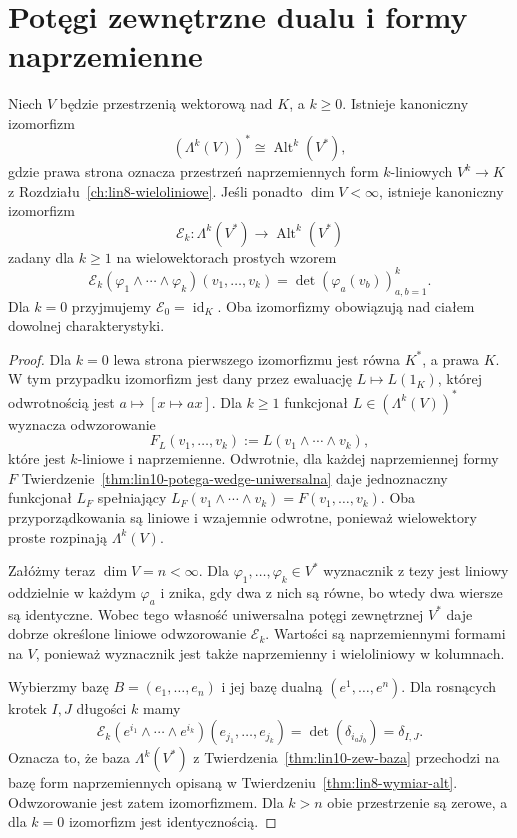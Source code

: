 \section{Potęgi zewnętrzne dualu i formy naprzemienne}
\label{sec:lin10-dual-formy}

\begin{twierdzenie}
\label{thm:lin10-formy-alt}
Niech \(V\) będzie przestrzenią
wektorową nad \(K\), a \(k\ge0\).
Istnieje kanoniczny izomorfizm
\[
 (\Lambda^k(V))^*
 \cong \operatorname{Alt}^k(V^*),
\]
gdzie prawa strona oznacza
przestrzeń naprzemiennych form
\(k\)-liniowych \(V^k\to K\)
z Rozdziału~\ref{ch:lin8-wieloliniowe}.
Jeśli ponadto \(\dim V<\infty\),
istnieje kanoniczny izomorfizm
\[
 \mathcal E_k\colon
 \Lambda^k(V^*)\longrightarrow
 \operatorname{Alt}^k(V^*)
\]
zadany dla \(k\ge1\) na
wielowektorach prostych wzorem
\[
 \mathcal E_k(\varphi_1\wedge\cdots\wedge\varphi_k)
 (v_1,\ldots,v_k)
 =\det(\varphi_a(v_b))_{a,b=1}^k.
\]
Dla \(k=0\) przyjmujemy
\(\mathcal E_0=\operatorname{id}_K\).
Oba izomorfizmy obowiązują
nad ciałem dowolnej charakterystyki.
\end{twierdzenie}
\begin{proof}
Dla \(k=0\) lewa strona pierwszego
izomorfizmu jest równa \(K^*\), a prawa
\(K\). W tym przypadku izomorfizm
jest dany przez ewaluację
\(L\mapsto L(1_K)\), której
odwrotnością jest
\(a\mapsto[x\mapsto ax]\).
Dla \(k\ge1\) funkcjonał
\(L\in(\Lambda^k(V))^*\)
wyznacza odwzorowanie
\[
 F_L(v_1,\ldots,v_k)
 :=L(v_1\wedge\cdots\wedge v_k),
\]
które jest \(k\)-liniowe
i naprzemienne.
Odwrotnie, dla każdej
naprzemiennej formy \(F\)
Twierdzenie~\ref{thm:lin10-potega-wedge-uniwersalna}
daje jednoznaczny funkcjonał
\(L_F\) spełniający
\(L_F(v_1\wedge\cdots\wedge v_k)
=F(v_1,\ldots,v_k)\).
Oba przyporządkowania są
liniowe i wzajemnie odwrotne,
ponieważ wielowektory proste
rozpinają \(\Lambda^k(V)\).

Załóżmy teraz \(\dim V=n<\infty\).
Dla \(\varphi_1,\ldots,\varphi_k\in V^*\)
wyznacznik z tezy jest
liniowy oddzielnie w każdym
\(\varphi_a\) i znika,
gdy dwa z nich są równe,
bo wtedy dwa wiersze są
identyczne.
Wobec tego własność uniwersalna
potęgi zewnętrznej \(V^*\)
daje dobrze określone liniowe
odwzorowanie \(\mathcal E_k\).
Wartości są naprzemiennymi
formami na \(V\), ponieważ
wyznacznik jest także
naprzemienny i wieloliniowy
w kolumnach.

Wybierzmy bazę
\(B=(e_1,\ldots,e_n)\)
i jej bazę dualną
\((e^1,\ldots,e^n)\).
Dla rosnących krotek \(I,J\)
długości \(k\) mamy
\[
 \mathcal E_k(
 e^{i_1}\wedge\cdots\wedge e^{i_k})
 (e_{j_1},\ldots,e_{j_k})
 =\det(\delta_{i_a j_b})
 =\delta_{I,J}.
\]
Oznacza to, że baza
\(\Lambda^k(V^*)\) z
Twierdzenia~\ref{thm:lin10-zew-baza}
przechodzi na bazę form
naprzemiennych opisaną w
Twierdzeniu~\ref{thm:lin8-wymiar-alt}.
Odwzorowanie jest zatem
izomorfizmem.
Dla \(k>n\) obie przestrzenie
są zerowe, a dla \(k=0\)
izomorfizm jest identycznością.
\end{proof}

